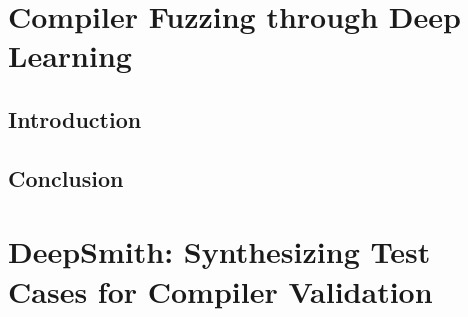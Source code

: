 \ifstapled
\chapter{Compiler Fuzzing through Deep Learning}
\section{Introduction}
\lipsum[1-2]

\section{Conclusion}
\lipsum[1-2]
\else
\chapter{DeepSmith: Synthesizing Test Cases for Compiler Validation}
\label{chap:deepsmith}






\fi
